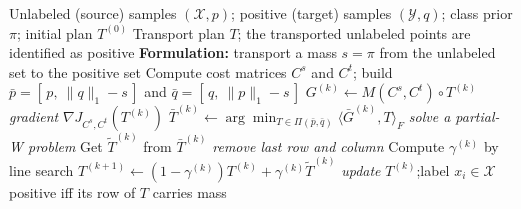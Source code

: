 \documentclass{article}
\begin{document}
\begin{algorithm}[!h]
\renewcommand{\algorithmicrequire}{\textbf{Input:}} %
\renewcommand{\algorithmicensure}{\textbf{Output:}} %
	\caption{Partial-OT PU (PU learning by partial optimal transport)} %
	\begin{algorithmic}[1] %
	    \REQUIRE
	    Unlabeled (source) samples $(\mathcal{X},p)$; positive (target) samples $(\mathcal{Y},q)$;
	    class prior $\pi$; initial plan $T^{(0)}$
	    \ENSURE
	    Transport plan $T$; the transported unlabeled points are identified as positive
	    \STATE \textbf{Formulation:} transport a mass $s=\pi$ from the unlabeled set to the positive set %
	    \STATE Compute cost matrices $C^{s}$ and $C^{t}$;
	    build $\bar{p}=[\,p,\ \|q\|_{1}-s\,]$ and $\bar{q}=[\,q,\ \|p\|_{1}-s\,]$ %
	    \STATE $G^{(k)}\leftarrow M(C^{s},C^{t})\circ T^{(k)}$
	    \hfill \emph{gradient} $\nabla J_{C^{s},C^{t}}(T^{(k)})$
	    \STATE $\bar{T}^{(k)}\leftarrow \arg\min_{T\in\Pi(\bar{p},\bar{q})}\langle \bar{G}^{(k)},T\rangle_{F}$
	    \hfill \emph{solve a partial-W problem} %
	    \STATE Get $\tilde{T}^{(k)}$ from $\bar{T}^{(k)}$
	    \hfill \emph{remove last row and column} %
	    \STATE Compute $\gamma^{(k)}$ by line search
	    \STATE $T^{(k+1)}\leftarrow (1-\gamma^{(k)})T^{(k)}+\gamma^{(k)}\tilde{T}^{(k)}$
	    \hfill \emph{update}
	    \ENDFOR
	    \RETURN $T^{(k)}$;\quad label $x_{i}\in\mathcal{X}$ positive iff its row of $T$ carries mass %
	\end{algorithmic}
\end{algorithm}
\end{document}

